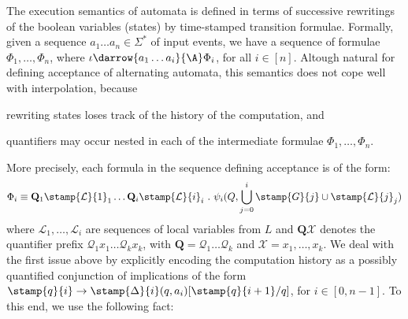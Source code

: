 The execution semantics of automata is defined in terms of successive
rewritings of the boolean variables (states) by time-stamped
transition formulae. Formally, given a sequence $a_1 \ldots a_n \in
\Sigma^*$ of input events, we have a sequence of formulae $\Phi_1,
\ldots, \Phi_n$, where $\iota \darrow{a_1 \ldots a_i}{\A} \Phi_i$, for
all $i \in [n]$. Altough natural for defining acceptance of
alternating automata, this semantics does not cope well with
interpolation, because\begin{inparaenum}[(1)]
\item rewriting states loses track of the history of the computation,
  and
%
\item quantifiers may occur nested in each of the intermediate
  formulae $\Phi_1,\ldots,\Phi_n$.
\end{inparaenum}

More precisely, each formula in the sequence defining acceptance is of
the form: \[\Phi_i \equiv \mathbf{Q}_1 \stamp{\mathcal{L}}{1}_1 \ldots
\mathbf{Q}_i \stamp{\mathcal{L}}{i}_i ~.~ \psi_i(Q,\bigcup_{j=0}^i
\stamp{G}{j} \cup \stamp{\mathcal{L}}{j}_j)\] where $\mathcal{L}_1,
\ldots, \mathcal{L}_i$ are sequences of local variables from $L$ and
$\mathbf{Q} \mathcal{X}$ denotes the quantifier prefix $\mathcal{Q}_1
x_1 \ldots \mathcal{Q}_k x_k$, with $\mathbf{Q} = \mathcal{Q}_1 \ldots
\mathcal{Q}_k$ and $\mathcal{X} = x_1,\ldots,x_k$. We deal with the
first issue above by explicitly encoding the computation history as a
possibly quantified conjunction of implications of the form
$\stamp{q}{i} \rightarrow \stamp{\Delta}{i}(q,a_i)[\stamp{q}{i+1}/q]$,
for $i \in [0,n-1]$. To this end, we use the following fact:

